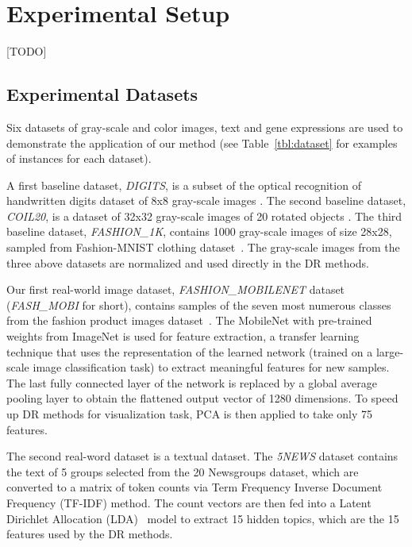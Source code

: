 \section{Experimental Setup}\label{sec:xp:setup}

[TODO]

\subsection{Experimental Datasets}\label{sec:xp:data}

Six datasets of gray-scale and color images, text and gene expressions are used to demonstrate the application of our method (see Table~\ref{tbl:dataset} for examples of instances for each dataset).

A first baseline dataset, \emph{DIGITS}, is a subset of the optical recognition of handwritten digits dataset of 8x8 gray-scale images \cite{kaynak1995methods}.
The second baseline dataset, \emph{COIL20}, is a dataset of 32x32 gray-scale images of 20 rotated objects  \cite{nene1996}.
The third baseline dataset, \emph{FASHION\_1K}, contains 1000 gray-scale images of size 28x28, sampled from Fashion-MNIST clothing dataset~\cite{xiao2017/online}.
The gray-scale images from the three above datasets are normalized and used directly in the DR methods.

Our first real-world image dataset, \emph{FASHION\_MOBILENET} dataset (\emph{FASH\_MOBI} for short), contains samples of the seven most numerous classes from the fashion product images dataset~\cite{fashionproduct}.
The MobileNet\cite{howard2017mobilenets} with pre-trained weights from ImageNet is used for feature extraction, a transfer learning technique that uses the representation of the learned network (trained on a large-scale image classification task) to extract meaningful features for new samples.
The last fully connected layer of the network is replaced by a global average pooling layer \cite{lin2013network} to obtain the flattened output vector of 1280 dimensions.
To speed up DR methods for visualization task, PCA is then applied to take only 75 features.

The second real-word dataset is a textual dataset. The \emph{5NEWS} dataset contains the text of 5 groups selected from the 20 Newsgroups dataset, which are converted to a matrix of token counts via Term Frequency Inverse Document Frequency (TF-IDF) method.
The count vectors are then fed into a Latent Dirichlet Allocation (LDA)~\cite{blei2003latent} model to extract 15 hidden topics, which are the 15 features used by the DR methods.

